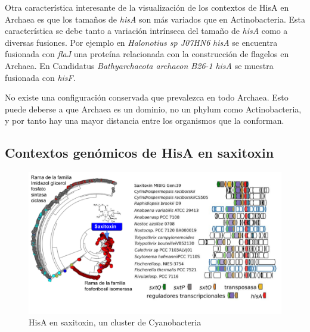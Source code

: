\documentclass[12pt,twoside]{reedthesis}
\begin{document}
  Otra característica interesante de la visualización de los contextos de
  HisA en Archaea es que los tamaños de \emph{hisA} son más variados que
  en Actinobacteria. Esta característica se debe tanto a variación
  intrínseca del tamaño de \emph{hisA} como a diversas fusiones. Por
  ejemplo en \emph{Halonotius sp J07HN6} \emph{hisA} se encuentra
  fusionada con \emph{flaJ} una proteína relacionada con la construcción
  de flagelos en Archaea. En Candidatus \emph{Bathyarchaeota archaeon
  B26-1} \emph{hisA} se muestra fusionada con \emph{hisF}.
  
  No existe una configuración conservada que prevalezca en todo Archaea.
  Esto puede deberse a que Archaea es un dominio, no un phylum como
  Actinobacteria, y por tanto hay una mayor distancia entre los organismos
  que la conforman.
  
  \subsection{Contextos genómicos de HisA en
  saxitoxin}\label{contextos-genomicos-de-hisa-en-saxitoxin}
  
  \begin{figure}[h!tbp]
  \centering
  \includegraphics[angle = 0,scale = 0.7]{chapter4/CORASON/saxitoxin.pdf}
  \caption[HisA en saxitoxin, un cluster de Cyanobacteria ]{\footnotesize{HisA en saxitoxin, un cluster de Cyanobacteria }}
  \label{fig:saxitoxin}
  \end{figure}
  
\end{document}
